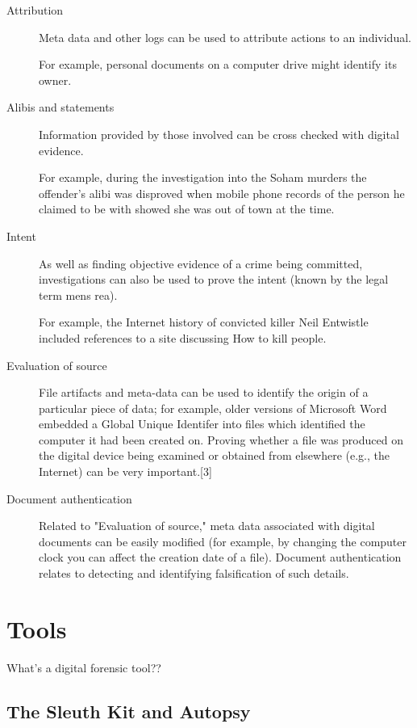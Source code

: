 \begin{description}
	\item [Attribution]
		Meta data and other logs can be used to attribute actions to an individual. 
		
		For example, personal documents on a computer drive might identify its owner.
	\item [Alibis and statements]
		Information provided by those involved can be cross checked with digital 
		evidence.
		
		For example, during the investigation into the Soham murders the offender's
		alibi was disproved when mobile phone records of the person he 	claimed to be
		with showed she was out of town at the time.
	\item [Intent]
		As well as finding objective evidence of a crime being committed, investigations
		can also be used to prove the intent (known by the legal term mens rea).
		
		For example, the Internet history of convicted killer Neil Entwistle included 
		references to a site discussing How to kill people.
	\item [Evaluation of source]
		File artifacts and meta-data can be used to identify the origin of a particular
		piece of data; for example, older versions of Microsoft Word embedded a Global
		Unique Identifer into files which identified the computer it had been created on. 
		Proving whether a file was produced on the digital device being examined or
		obtained from elsewhere (e.g., the Internet) can be very important.[3]
	\item [Document authentication]
		Related to "Evaluation of source," meta data associated with digital documents
		can be easily modified (for example, by changing the computer clock you can affect
		the creation date of a file). Document authentication relates to detecting and
		identifying falsification of such details.
\end{description}

\section{Tools}

What's a digital forensic tool??

\subsection{The Sleuth Kit and Autopsy}


